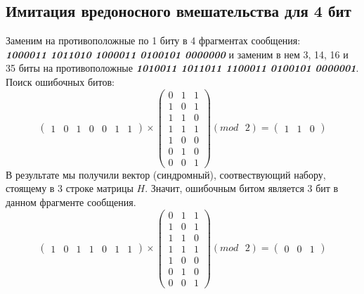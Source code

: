 \documentclass[a5paper, 10pt]{article}
\theoremstyle{definition}
\theoremstyle{plain}
\theoremstyle{remark}
\begin{document}
\subsection{Имитация вредоносного вмешательства для 4 бит}
Заменим на противоположные по 1 биту в 4 фрагментах сообщения:\\
 \textbf{\textit{10\colorbox[rgb]{0.50, 0.5, 0.5}{0}0011 101101\colorbox[rgb]{0.50, 0.5, 0.5}{0} 1\colorbox[rgb]{0.50, 0.5, 0.5}{0}00011 0100101 000000\colorbox[rgb]{0.50, 0.5, 0.5}{0}}} и заменим в нем 3, 14, 16 и 35 биты на противоположные  \textbf{\textit{10\colorbox[rgb]{0.4, 0.8, 0.8}{1}0011 101101\colorbox[rgb]{0.4, 0.8, 0.8}{1} 1\colorbox[rgb]{0.4, 0.8, 0.8}{1}00011 0100101 000000\colorbox[rgb]{0.4, 0.8, 0.8}{1}}}.\\
Поиск ошибочных битов:
\begin{equation}
\begin{pmatrix}
1 & 0 & 1 & 0 & 0 & 1 & 1
\end{pmatrix}
 \times
\begin{pmatrix}
0 & 1 & 1\\
1 & 0 & 1\\
1 & 1 & 0\\
1 & 1 & 1 \\
1 & 0 & 0\\
0 & 1 & 0 \\
0 & 0 & 1
\end{pmatrix}
(mod \text{ }2)
= \begin{pmatrix}
1 & 1 & 0 
\end{pmatrix}
\end{equation}
В результате мы получили вектор (синдромный), соотвествующий набору, стоящему в 3 строке матрицы $H$. Значит, ошибочным битом является 3 бит в данном фрагменте сообщения.\\
\begin{equation}
\begin{pmatrix}
1 & 0 & 1 & 1 & 0 & 1 & 1
\end{pmatrix}
 \times
\begin{pmatrix}
0 & 1 & 1\\
1 & 0 & 1\\
1 & 1 & 0\\
1 & 1 & 1 \\
1 & 0 & 0\\
0 & 1 & 0 \\
0 & 0 & 1
\end{pmatrix}
(mod \text{ }2)
= \begin{pmatrix}
0 & 0 & 1 
\end{pmatrix}
\end{equation}
\end{document}
